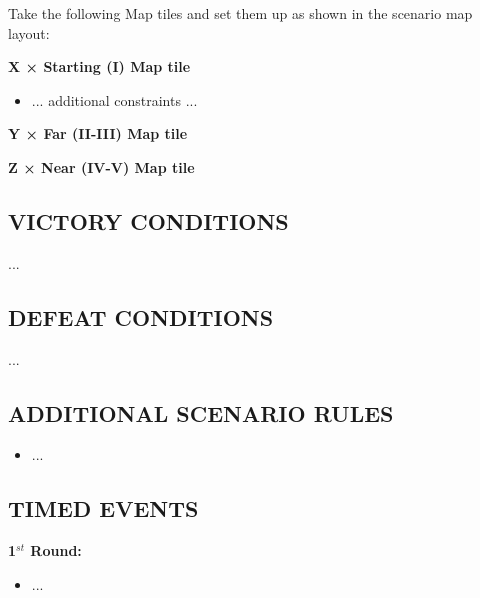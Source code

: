 \begin{multicols*}{2}
Take the following Map tiles and set them up as shown in the scenario map layout:

  \textbf{X × Starting (I) Map tile}
\begin{itemize}
    \item ... additional constraints ...
\end{itemize}

\textbf{Y × Far (II-III) Map tile}

\textbf{Z × Near (IV-V) Map tile}

\subsection*{\MakeUppercase{Victory Conditions}}
...

\subsection*{\MakeUppercase{Defeat Conditions}}
...

\subsection*{\MakeUppercase{Additional scenario rules}}

\begin{itemize}
    \item ...
\end{itemize}

\subsection*{\MakeUppercase{Timed events}}

\textbf{1$^{st}$ Round:}
\begin{itemize}
    \item ...
\end{itemize}

\end{multicols*}





